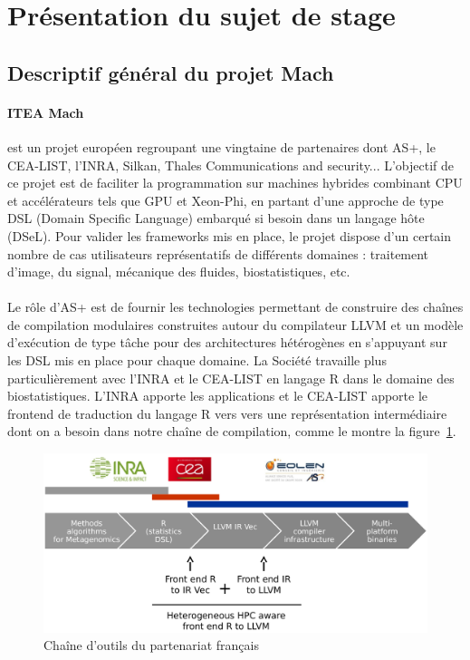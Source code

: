 \section{Présentation du sujet de stage}
\subsection{Descriptif général du projet Mach}
\paragraph{ITEA Mach~\cite{mach}}
est un projet européen regroupant une vingtaine de partenaires dont AS+, le
CEA-LIST, l'INRA, Silkan, Thales Communications and security... L'objectif de ce
projet est de faciliter la programmation sur machines hybrides combinant CPU et
accélérateurs tels que GPU et Xeon-Phi, en partant d'une approche de type DSL
(Domain Specific Language) embarqué si besoin dans un langage hôte (DSeL). Pour
valider les frameworks mis en place, le projet dispose d’un certain nombre de
cas utilisateurs représentatifs de différents domaines : traitement d’image, du
signal, mécanique des fluides, biostatistiques, etc.

\paragraph{}
Le rôle d'AS+ est de fournir les technologies permettant de construire des
chaînes de compilation modulaires construites autour du compilateur LLVM et un
modèle d’exécution de type tâche pour des architectures hétérogènes en
s’appuyant sur les DSL mis en place pour chaque domaine. La Société travaille
plus particulièrement avec l’INRA et le CEA-LIST en langage R dans le domaine
des biostatistiques. L’INRA apporte les applications et le CEA-LIST apporte le
frontend de traduction du langage R vers vers une représentation intermédiaire
dont on a besoin dans notre chaîne de compilation, comme le montre la
figure~\ref{toolchain_fr}.

\begin{figure}[h!]
   \begin{center}
      \includegraphics[width=135mm]{./images/toolchain_fr.png}
   \end{center}
   \caption{Chaîne d'outils du partenariat français~\cite{toolchain_fr}}
   \label{toolchain_fr}
\end{figure}

